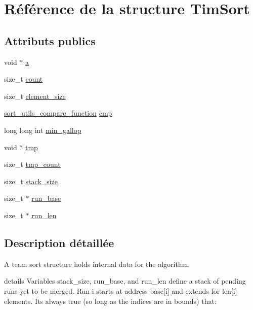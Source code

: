 \hypertarget{struct_tim_sort}{}\section{Référence de la structure Tim\+Sort}
\label{struct_tim_sort}
\subsection*{Attributs publics}
\begin{DoxyCompactItemize}
\item 
void $\ast$ \mbox{\hyperlink{struct_tim_sort_ae06e936999af8a0b9e865016ea5cdc5e}{a}}
\item 
size\+\_\+t \mbox{\hyperlink{struct_tim_sort_ae858cf5f25b0a6efaebaac1b307ab1d9}{count}}
\item 
size\+\_\+t \mbox{\hyperlink{struct_tim_sort_a153513d2ef446b6ccd7080f6d1ba7072}{element\+\_\+size}}
\item 
\mbox{\hyperlink{sort__utils_8h_a9cf5dbf2659d97b36bb0065d92103647}{sort\+\_\+utils\+\_\+compare\+\_\+function}} \mbox{\hyperlink{struct_tim_sort_a695f16b718861286692c213382c246f1}{cmp}}
\item 
long long int \mbox{\hyperlink{struct_tim_sort_af4e7fef2199d2679c953b8bd3565d191}{min\+\_\+gallop}}
\item 
void $\ast$ \mbox{\hyperlink{struct_tim_sort_a8443b25e49565bc8ca3fc5132edaede4}{tmp}}
\item 
size\+\_\+t \mbox{\hyperlink{struct_tim_sort_a9a3335f5cebd86067029fac7514c3ebc}{tmp\+\_\+count}}
\item 
size\+\_\+t \mbox{\hyperlink{struct_tim_sort_aeafc74038940336d5e72f707ecff09b8}{stack\+\_\+size}}
\item 
size\+\_\+t $\ast$ \mbox{\hyperlink{struct_tim_sort_ae0dad096ec6dd11f7d37eca1a9a8886b}{run\+\_\+base}}
\item 
size\+\_\+t $\ast$ \mbox{\hyperlink{struct_tim_sort_aaf3301ea993020bb46b98309fca6fa73}{run\+\_\+len}}
\end{DoxyCompactItemize}


\subsection{Description détaillée}
A team sort structure holds internal data for the algorithm.

details Variables {\ttfamily stack\+\_\+size}, {\ttfamily run\+\_\+base}, and {\ttfamily run\+\_\+len} define a stack of pending runs yet to be merged. Run i starts at address base\mbox{[}i\mbox{]} and extends for len\mbox{[}i\mbox{]} elements. It\textquotesingle{}s always true (so long as the indices are in bounds) that\+:

